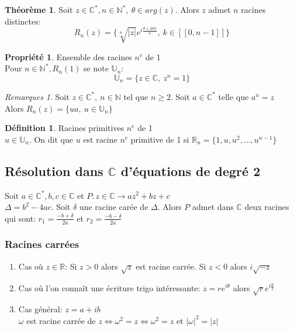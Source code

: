 \documentclass[fleqn]{article}
\theoremstyle{definition} \newtheorem*{defi}{D\'efinition}
\theoremstyle{definition} \newtheorem*{theo}{Th\'eor\`eme}
\theoremstyle{definition} \newtheorem*{coro}{Corollaire}
\theoremstyle{remark} \newtheorem*{rqs}{Remarques}
\theoremstyle{definition} \newtheorem*{prop}{Propri\'et\'e}
\begin{document}
\begin{theo} Soit $z \in \mathbb{C}^*, n \in \mathbb{N}^*,\ \theta \in arg(z)$. Alors $z$ admet $n$ racines distinctes:
	\[R_n(z) = \{\sqrt[n]{|z|}e^{i \frac{\theta + 2k\pi}{n}},\ k \in [\![0,n-1]\!] \}\]
\end{theo}

\begin{prop} Ensemble des racines $n^e$ de 1 \\
	Pour $n \in \mathbb{N}^*, R_n(1)$ se note $\mathbb{U}_n$:
	\[\mathbb{U}_n = \{z \in \mathbb{C},\ z^n = 1\}\]
\end{prop}

\begin{rqs}
	Soit $z \in \mathbb{C}^*,\ n \in \mathbb{N}$ tel que $n \geq 2$. Soit $a \in \mathbb{C}^*$ telle que $a^n = z$ \\
	Alors $R_n(z) = \{ua,\ u \in \mathbb{U}_n\}$
\end{rqs}

\begin{defi} Racines primitives $n^e$ de 1 \\
	$u \in \mathbb{U}_n$. On dit que $u$ est racine $n^e$ primitive de 1 si $\mathbb{R}_n = \{1, u, u^2, \hdots, u^{n-1}\}$
\end{defi}

\subsection{R\'esolution dans $\mathbb{C}$ d'\'equations de degr\'e 2}
Soit $a \in \mathbb{C}^*,b,c \in \mathbb{C}$ et $P: z \in \mathbb{C} \rightarrow az^2 + bz + c$ \\
$\Delta = b^2 -4ac$. Soit $\delta$ une racine car\'ee de $\Delta$. Alors $P$ admet dans $\mathbb{C}$ deux racines qui sont: $r_1 =
\frac{-b+\delta}{2a}$ et $r_2 = \frac{-b-\delta}{2a}$

\subsubsection{Racines carr\'ees}
\begin{enumerate}
	\item Cas o\`u $z \in \mathbb{R}$: Si $z > 0$ alors $\sqrt{z}$ est racine carr\'ee. Si $z < 0$ alors $i\sqrt{-z}$
	\item Cas o\`u l'on conna\^it une \'ecriture trigo int\'eressante: $z = re^{i\theta}$ alors $\sqrt{r}e^{i\frac{\theta}{2}}$
	\item Cas g\'en\'eral: $z = a + ib$ \\
		$\omega$ est racine carr\'ee de $z \Leftrightarrow \omega^2 = z \Leftrightarrow \omega^2 = z$ et $|\omega|^2 = |z|$
\end{enumerate}
\end{document}
